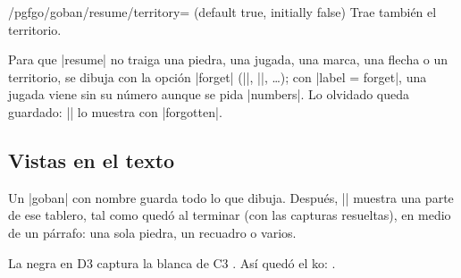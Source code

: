 	\begin{key}{/pgfgo/goban/resume/territory= (default true, initially false)}
		Trae también el territorio.

		\begin{codeexample}[]

			\begin{goban}[name = guardado]
			\end{goban}

			\begin{goban}[resume = guardado]
			\end{goban}

			\begin{goban}[resume = {guardado, numbers, marks, territory}]
			\end{goban}
		\end{codeexample}
	\end{key}

	Para que |resume| no traiga una piedra, una jugada, una marca, una flecha o un territorio, se dibuja con la opción |forget| (||, ||, \ldots); con |label = forget|, una jugada viene sin su número aunque se pida |numbers|. Lo olvidado queda guardado: |\pgfgoview| lo muestra con |forgotten|.

	\subsection{Vistas en el texto}
	\label{subsec:vistas}
	Un |goban| con nombre guarda todo lo que dibuja. Después, |\pgfgoview| muestra una parte de ese tablero, tal como quedó al terminar (con las capturas resueltas), en medio de un párrafo: una sola piedra, un recuadro o varios.

	\begin{codeexample}[]
		\begin{goban}[5, name = tablero1, captures]
		\end{goban}

		La negra en D3  captura la blanca de C3 .
		Así quedó el ko: .
	\end{codeexample}

